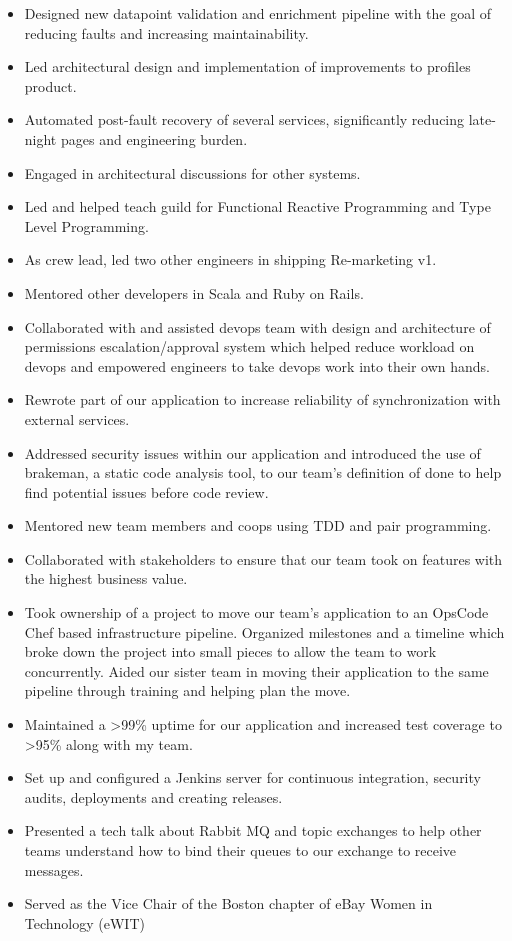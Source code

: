\documentclass[10pt,letterpaper]{altacv}
\begin{document}
\begin{itemize}
\item Designed new datapoint validation and enrichment pipeline with the goal of reducing faults and increasing maintainability.
\item Led architectural design and implementation of improvements to profiles product.
\item Automated post-fault recovery of several services, significantly reducing late-night pages and engineering burden.
\item Engaged in architectural discussions for other systems.
\item Led and helped teach guild for Functional Reactive Programming and Type Level Programming.
\item As crew lead, led two other engineers in shipping Re-marketing v1.
\item Mentored other developers in Scala and Ruby on Rails.
\item Collaborated with and assisted devops team with design and architecture of permissions escalation/approval system which helped reduce workload on devops and empowered engineers to take devops work into their own hands.
\end{itemize}

\clearpage

\begin{itemize}
\item Rewrote part of our application to increase reliability of synchronization with external services.
\item Addressed security issues within our application and introduced the use of brakeman, a static code analysis tool, to our team's definition of done to help find potential issues before code review.
\item Mentored new team members and coops using TDD and pair programming.
\item Collaborated with stakeholders to ensure that our team took on features with the highest business value.
\item Took ownership of a project to move our team's application to an OpsCode Chef based infrastructure pipeline. Organized milestones and a timeline which broke down the project into small pieces to allow the team to work concurrently. Aided our sister team in moving their application to the same pipeline through training and helping plan the move.
\item Maintained a >99\% uptime for our application and increased test coverage to >95\% along with my team.
\item Set up and configured a Jenkins server for continuous integration, security audits, deployments and creating releases.
\item Presented a tech talk about Rabbit MQ and topic exchanges to help other teams understand how to bind their queues to our exchange to receive messages.
\item Served as the Vice Chair of the Boston chapter of eBay Women in Technology (eWIT)
\end{itemize}
\end{document}
